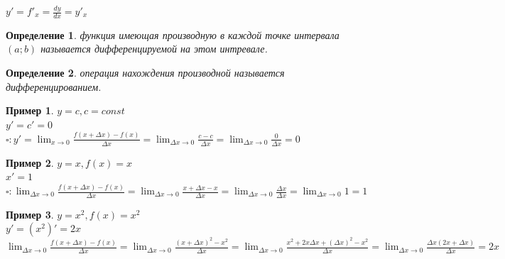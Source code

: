 \documentclass[12pt, a4paper]{article}
\newtheorem{definition}{Определение}[subsection]
\newtheorem{example}{Пример}[subsection]
\theoremstyle{remark}
\begin{document}
	$y' = f'_x = \frac{dy}{dx} = y'_x$ \\
	
	\begin{definition}
		функция имеющая производную в каждой точке интервала $(a; b)$ называется дифференцируемой на этом интревале.
	\end{definition}
	
	\begin{definition}
		операция нахождения производной называется дифференцированием.
	\end{definition}
	
	\begin{example}
		$y = c, c = const$ \\
		
		$y' = c'= 0$ \\
		
		$\square: y' = \lim_{x \to 0} \frac{f(x + \Delta x) - f(x)}{\Delta x} = \lim_{\Delta x \to 0} \frac{c - c}{\Delta x} = \lim_{\Delta x \to 0} \frac{0}{\Delta x} = 0$ \\
	\end{example}
	
	\begin{example}
		$y = x, f(x) = x$ \\
		
		$x' = 1$ \\
		
		$\square: \lim_{\Delta x \to 0} \frac{f(x + \Delta x) - f(x)}{\Delta x} = \lim_{\Delta x \to 0} \frac{x  + \Delta x - x}{\Delta x} = \lim_{\Delta x \to 0} \frac{\Delta x}{\Delta x} = \lim_{\Delta x \to 0} 1 = 1$
	\end{example} 
	
	\begin{example}
		$y = x^2, f(x) = x^2$ \\
		
		$y' = (x^2)' = 2x$ \\
		
		$\lim_{\Delta x \to 0} \frac{f(x + \Delta x) - f(x)}{\Delta x} = \lim_{\Delta x \to 0} \frac{(x + \Delta x)^2 - x^2}{\Delta x} = \lim_{\Delta x \to 0} \frac{x^2 + 2x\Delta x + (\Delta x)^2 - x^2}{\Delta x} = {\lim_{\Delta x \to 0} \frac{\Delta x(2x + \Delta x)}{\Delta x} = 2x}$
	\end{example}
	
	\newpage
	
\end{document}
